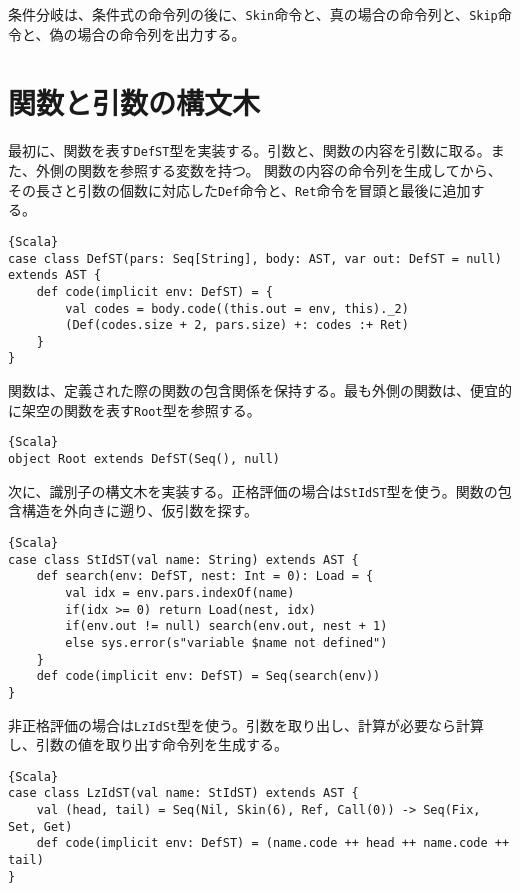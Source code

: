 \documentclass[10pt,a4paper]{book}
\begin{document}
条件分岐は、条件式の命令列の後に、\texttt{Skin}命令と、真の場合の命令列と、\texttt{Skip}命令と、偽の場合の命令列を出力する。

\section{関数と引数の構文木\label{sect:CallST}}

最初に、関数を表す\texttt{DefST}型を実装する。引数と、関数の内容を引数に取る。また、外側の関数を参照する変数を持つ。
関数の内容の命令列を生成してから、その長さと引数の個数に対応した\texttt{Def}命令と、\texttt{Ret}命令を冒頭と最後に追加する。

\begin{Verbatim}{Scala}
case class DefST(pars: Seq[String], body: AST, var out: DefST = null) extends AST {
	def code(implicit env: DefST) = {
		val codes = body.code((this.out = env, this)._2)
		(Def(codes.size + 2, pars.size) +: codes :+ Ret)
	}
}
\end{Verbatim}

関数は、定義された際の関数の包含関係を保持する。最も外側の関数は、便宜的に架空の関数を表す\texttt{Root}型を参照する。

\begin{Verbatim}{Scala}
object Root extends DefST(Seq(), null)
\end{Verbatim}

次に、識別子の構文木を実装する。正格評価の場合は\texttt{StIdST}型を使う。関数の包含構造を外向きに遡り、仮引数を探す。

\begin{Verbatim}{Scala}
case class StIdST(val name: String) extends AST {
	def search(env: DefST, nest: Int = 0): Load = {
		val idx = env.pars.indexOf(name)
		if(idx >= 0) return Load(nest, idx)
		if(env.out != null) search(env.out, nest + 1)
		else sys.error(s"variable $name not defined")
	}
	def code(implicit env: DefST) = Seq(search(env))
}
\end{Verbatim}

非正格評価の場合は\texttt{LzIdSt}型を使う。引数を取り出し、計算が必要なら計算し、引数の値を取り出す命令列を生成する。

\begin{Verbatim}{Scala}
case class LzIdST(val name: StIdST) extends AST {
	val (head, tail) = Seq(Nil, Skin(6), Ref, Call(0)) -> Seq(Fix, Set, Get)
	def code(implicit env: DefST) = (name.code ++ head ++ name.code ++ tail)
}
\end{Verbatim}
\end{document}
